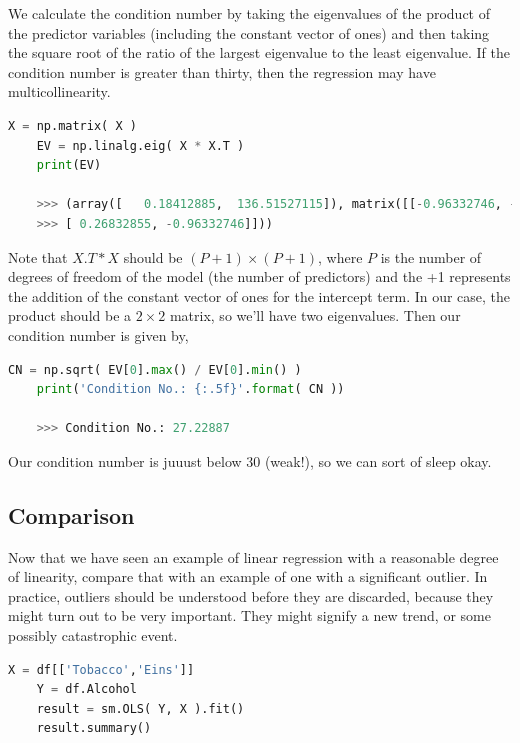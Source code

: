 We calculate the condition number by taking the eigenvalues of the product of the predictor variables (including the constant vector of ones) and then taking the square root of the ratio of the largest eigenvalue to the least eigenvalue. If the condition number is greater than thirty, then the regression may have multicollinearity.

\begin{lstlisting}[language=Python]	
    X = np.matrix( X )
    EV = np.linalg.eig( X * X.T )
    print(EV)

    >>> (array([   0.18412885,  136.51527115]), matrix([[-0.96332746, -0.26832855],
    >>> [ 0.26832855, -0.96332746]]))

\end{lstlisting}

Note that $X.T * X$ should be $( P + 1 ) \times ( P + 1 )$, where $P$ is the number of degrees of freedom of the model (the number of predictors) and the +1 represents the addition of the constant vector of ones for the intercept term. In our case, the product should be a $2 \times 2$ matrix, so we’ll have two eigenvalues. Then our condition number is given by,


\begin{lstlisting}[language=Python]	
    CN = np.sqrt( EV[0].max() / EV[0].min() )
    print('Condition No.: {:.5f}'.format( CN ))

    >>> Condition No.: 27.22887
\end{lstlisting}

Our condition number is juuust below 30 (weak!), so we can sort of sleep okay.

\subsection{Comparison}

Now that we have seen an example of linear regression with a reasonable degree of linearity, compare that with an example of one with a significant outlier. In practice, outliers should be understood before they are discarded, because they might turn out to be very important. They might signify a new trend, or some possibly catastrophic event.

\begin{lstlisting}[language=Python]
    X = df[['Tobacco','Eins']]
    Y = df.Alcohol
    result = sm.OLS( Y, X ).fit()
    result.summary()
\end{lstlisting}

